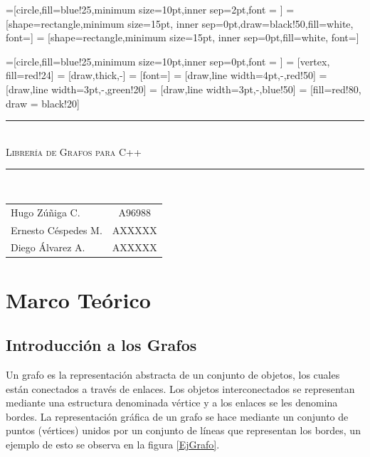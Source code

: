 \documentclass[a4paper, 11pt]{report}
\newcommand{\HRule}[1]{\rule{\linewidth}{#1}}
\begin{document}
=[circle,fill=blue!25,minimum size=10pt,inner sep=2pt,font = \small]
 = [shape=rectangle,minimum size=15pt, inner sep=0pt,draw=black!50,fill=white, font=\scriptsize]
 = [shape=rectangle,minimum size=15pt, inner sep=0pt,fill=white, font=\footnotesize]

=[circle,fill=blue!25,minimum size=10pt,inner sep=0pt,font = \tiny]
 = [vertex, fill=red!24]
 = [draw,thick,-]
 = [font=\scriptsize]
 = [draw,line width=4pt,-,red!50]
 = [draw,line width=3pt,-,green!20]
 = [draw,line width=3pt,-,blue!50]
 = [fill=red!80, draw = black!20]

\begin{titlepage}
    \begin{center}
        \HRule{0.5mm}\\[0.12cm]
        \textsc{\huge Librer\'ia de Grafos para C++}\\[0.2cm]
        \HRule{0.8mm}\\[1.7cm]
        \begin{flushright}
        \begin{tabular}{l c}
            Hugo Z\'u\~niga C. & A96988 \\
            Ernesto C\'espedes M. & AXXXXX \\
            Diego \'Alvarez A. & AXXXXX \\
        \end{tabular}
        \end{flushright}

    \end{center}
\end{titlepage}

\chapter{Marco Te\'orico}
\section{Introducci\'on a los Grafos}
Un grafo es la representaci\'on abstracta de un conjunto de objetos, los cuales est\'an conectados a trav\'es de enlaces. Los objetos interconectados se representan mediante una estructura denominada v\'ertice y a los enlaces se les denomina bordes. La representaci\'on  gr\'afica de un grafo se hace mediante un conjunto de puntos (v\'ertices) unidos por un conjunto de l\'ineas que representan los bordes, un ejemplo de esto se observa en la figura \ref{EjGrafo}.
\end{document}
